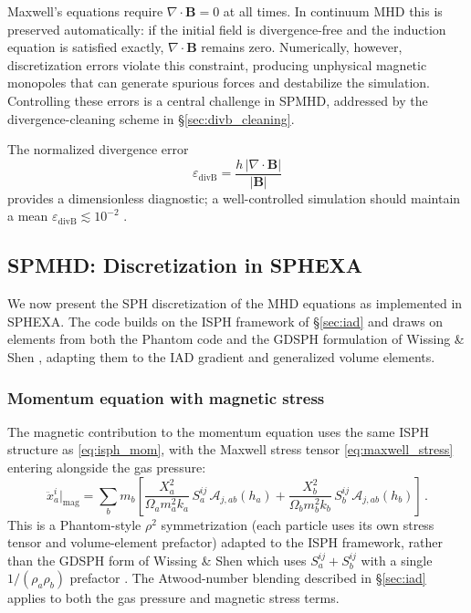 Maxwell's equations require $\nabla \cdot \mathbf{B} = 0$ at all times. In continuum MHD this is preserved automatically: if the initial field is divergence-free and the induction equation is satisfied exactly, $\nabla \cdot \mathbf{B}$ remains zero. Numerically, however, discretization errors violate this constraint, producing unphysical magnetic monopoles that can generate spurious forces and destabilize the simulation. Controlling these errors is a central challenge in SPMHD, addressed by the divergence-cleaning scheme in \S\ref{sec:divb_cleaning}.

The normalized divergence error
\begin{equation}
    \varepsilon_{\mathrm{divB}} = \frac{h\,|\nabla \cdot \mathbf{B}|}{|\mathbf{B}|}
    \label{eq:divb_error}
\end{equation}
provides a dimensionless diagnostic; a well-controlled simulation should maintain a mean $\varepsilon_\mathrm{divB} \lesssim 10^{-2}$ \cite{Wissing2020, Price2018}.



\subsection{SPMHD: Discretization in SPHEXA}
\label{sec:spmhd}

We now present the SPH discretization of the MHD equations as implemented in SPHEXA. The code builds on the ISPH framework of \S\ref{sec:iad} and draws on elements from both the Phantom code \cite{Price2018} and the GDSPH formulation of Wissing \& Shen \cite{Wissing2020}, adapting them to the IAD gradient and generalized volume elements.


\subsubsection*{Momentum equation with magnetic stress}

The magnetic contribution to the momentum equation uses the same ISPH structure as \eqref{eq:isph_mom}, with the Maxwell stress tensor \eqref{eq:maxwell_stress} entering alongside the gas pressure:
\begin{equation}
    \ddot{x}^i_a\big|_\mathrm{mag} = \sum_b m_b \left[ \frac{X_a^2}{\Omega_a m_a^2 k_a}\, S_a^{ij}\, \mathcal{A}_{j,ab}(h_a) + \frac{X_b^2}{\Omega_b m_b^2 k_b}\, S_b^{ij}\, \mathcal{A}_{j,ab}(h_b) \right]\,.
    \label{eq:spmhd_mom}
\end{equation}
This is a Phantom-style $\rho^2$ symmetrization (each particle uses its own stress tensor and volume-element prefactor) adapted to the ISPH framework, rather than the GDSPH form of Wissing \& Shen \cite{Wissing2020} which uses $S_a^{ij} + S_b^{ij}$ with a single $1/(\rho_a \rho_b)$ prefactor \cite{Price2018}. The Atwood-number blending described in \S\ref{sec:iad} applies to both the gas pressure and magnetic stress terms.


